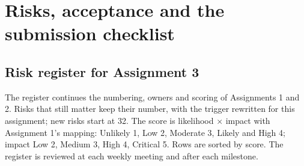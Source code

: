 \section{Risks, acceptance and the submission checklist}
\label{sec:risks}

\subsection{Risk register for Assignment 3}
\label{sec:riskregister}

The register continues the numbering, owners and scoring of Assignments 1 and 2. Risks that still
matter keep their number, with the trigger rewritten for this assignment; new risks start at 32.
The score is likelihood × impact with Assignment 1's mapping: Unlikely 1, Low 2, Moderate 3, Likely
and High 4; impact Low 2, Medium 3, High 4, Critical 5. Rows are sorted by score. The register is
reviewed at each weekly meeting and after each milestone.

